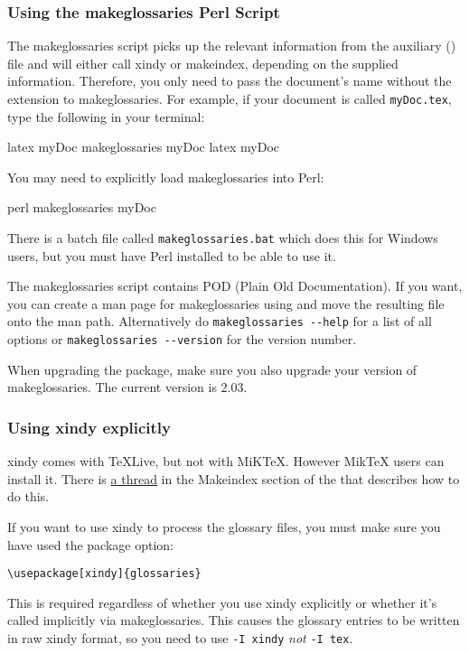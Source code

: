 \documentclass{nlctdoc}
\begin{document}
\subsubsection{Using the makeglossaries Perl Script}
\label{sec:makeglossariesapp}

The \gls{makeglossaries} script picks up the relevant information
from the auxiliary () file and will either call
\gls{xindy} or \gls{makeindex}, depending on the supplied
information. Therefore, you only need to pass the document's name
without the extension to \gls*{makeglossaries}. For example, if your
document is called \texttt{myDoc.tex}, type the following in your
terminal:
\begin{prompt}
latex myDoc
makeglossaries myDoc
latex myDoc
\end{prompt}
You may need to explicitly load \gls{makeglossaries} into Perl:
\begin{prompt}
perl makeglossaries myDoc
\end{prompt}
There is a batch file called \texttt{makeglossaries.bat} which does
this for Windows users, but you must have Perl installed to be able
to use it.

The \gls{makeglossaries} script contains POD (Plain Old
Documentation). If you want, you can create a man page for
\gls*{makeglossaries} using  and move the 
resulting file onto the man path. Alternatively do
\texttt{makeglossaries -{}-help} for a list of all options or
\texttt{makeglossaries -{}-version} for the version number.

\begin{important}
When upgrading the  package, make sure you also
upgrade your version of \gls{makeglossaries}. The current version is
2.03.
\end{important}

\subsubsection{Using xindy explicitly}
\label{sec:xindyapp}

\Gls{xindy} comes with TeXLive, but not with MiKTeX. However MikTeX
users can install it. There is
\href{http://www.latex-community.org/forum/viewtopic.php?f=51&t=5383}{a
thread} in the Makeindex section of the
 that
describes how to do this.

If you want to use \gls{xindy} to process the glossary
files, you must make sure you have used the 
 package option:
\begin{verbatim}
\usepackage[xindy]{glossaries}
\end{verbatim}
This is required regardless of whether you use \gls{xindy}
explicitly or whether it's called implicitly via 
\gls{makeglossaries}. This causes the glossary 
entries to be written in raw \gls*{xindy} format, so you need to
use \texttt{-I xindy} \emph{not} \texttt{-I tex}.
\end{document}
